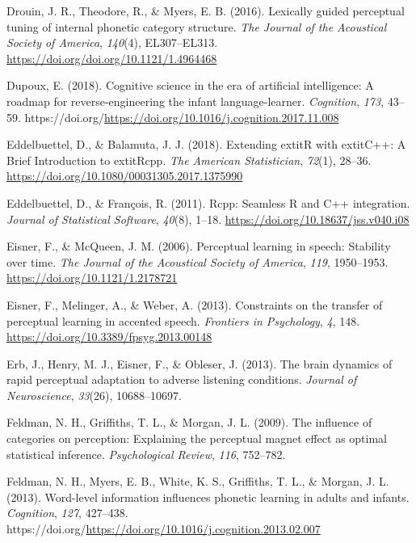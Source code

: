 \documentclass[
  11pt,
  man,floatsintext]{apa6}
\newlength{\cslhangindent}
\newlength{\cslentryspacingunit} %
\newenvironment{CSLReferences}[2] %
 {%
  \setlength{\parindent}{0pt}
  \ifodd #1
  \let\oldpar\par
  \def\par{\hangindent=\cslhangindent\oldpar}
  \fi
  \setlength{\parskip}{#2\cslentryspacingunit}
 }%
 {}
\begin{document}
\begin{CSLReferences}{1}{0}
\leavevmode{}%
Drouin, J. R., Theodore, R., \& Myers, E. B. (2016). Lexically guided perceptual tuning of internal phonetic category structure. \emph{The Journal of the Acoustical Society of America}, \emph{140}(4), EL307--EL313. \url{https://doi.org/doi.org/10.1121/1.4964468}

\leavevmode{}%
Dupoux, E. (2018). Cognitive science in the era of artificial intelligence: A roadmap for reverse-engineering the infant language-learner. \emph{Cognition}, \emph{173}, 43--59. https://doi.org/\url{https://doi.org/10.1016/j.cognition.2017.11.008}

\leavevmode{}%
Eddelbuettel, D., \& Balamuta, J. J. (2018). {Extending extit{R} with extit{C++}: A Brief Introduction to extit{Rcpp}}. \emph{The American Statistician}, \emph{72}(1), 28--36. \url{https://doi.org/10.1080/00031305.2017.1375990}

\leavevmode{}%
Eddelbuettel, D., \& François, R. (2011). {Rcpp}: Seamless {R} and {C++} integration. \emph{Journal of Statistical Software}, \emph{40}(8), 1--18. \url{https://doi.org/10.18637/jss.v040.i08}

\leavevmode{}%
Eisner, F., \& McQueen, J. M. (2006). Perceptual learning in speech: Stability over time. \emph{The Journal of the Acoustical Society of America}, \emph{119}, 1950--1953. \url{https://doi.org/10.1121/1.2178721}

\leavevmode{}%
Eisner, F., Melinger, A., \& Weber, A. (2013). Constraints on the transfer of perceptual learning in accented speech. \emph{Frontiers in Psychology}, \emph{4}, 148. \url{https://doi.org/10.3389/fpsyg.2013.00148}

\leavevmode{}%
Erb, J., Henry, M. J., Eisner, F., \& Obleser, J. (2013). The brain dynamics of rapid perceptual adaptation to adverse listening conditions. \emph{Journal of Neuroscience}, \emph{33}(26), 10688--10697.

\leavevmode{}%
Feldman, N. H., Griffiths, T. L., \& Morgan, J. L. (2009). The influence of categories on perception: Explaining the perceptual magnet effect as optimal statistical inference. \emph{Psychological Review}, \emph{116}, 752--782.

\leavevmode{}%
Feldman, N. H., Myers, E. B., White, K. S., Griffiths, T. L., \& Morgan, J. L. (2013). Word-level information influences phonetic learning in adults and infants. \emph{Cognition}, \emph{127}, 427--438. https://doi.org/\url{https://doi.org/10.1016/j.cognition.2013.02.007}


\end{CSLReferences}
\end{document}
